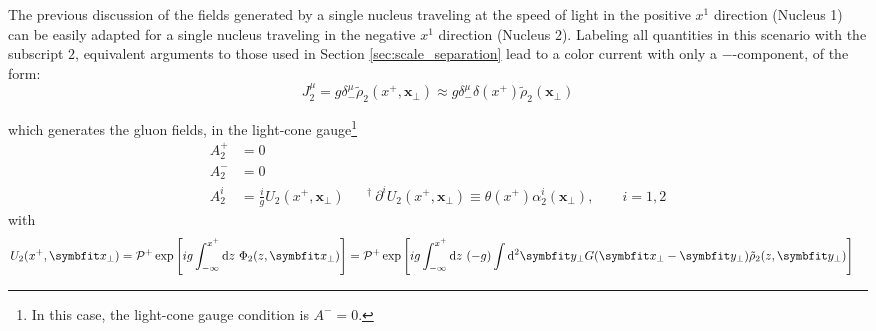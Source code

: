 %
%
\bigskip
The previous discussion of the fields generated by a single nucleus traveling at the speed of light in the positive $x^1$ direction (Nucleus 1) can be easily adapted for a single nucleus traveling in the negative $x^1$ direction (Nucleus 2). Labeling all quantities in this scenario with the subscript $2$, equivalent arguments to those used in Section \ref{sec:scale_separation} lead to a color current with only a $-$-component, of the form:
\begin{equation}
	J_2^\mu = g \delta^{\mu}_- \tilde{\rho}_2(x^+,\mathbf{x}_\perp) \approx g \delta^{\mu}_- \delta (x^+) \tilde{\rho}_2(\mathbf{x}_\perp)
\end{equation}

which generates the gluon fields, in the light-cone gauge\footnote{In this case, the light-cone gauge condition is $A^- = 0$.}
\begin{subequations}
	\begin{alignat}{2}
		A^+_2 & = 0 && \\
		A^-_2 & = 0 && \\
		A^i_2 & = \frac{i}{g} U_2(x^+,\mathbf{x}_\perp)&& ^\dagger ~  \partial^i U_2(x^+,\mathbf{x}_\perp) \equiv \theta(x^+) \alpha_2^i(\mathbf{x}_\perp), \qquad i = 1,2
	\end{alignat}
	\label{eq:A_lc_one_nucleus_2}
\end{subequations}
with
\begin{align}
	U_2(x^+, \mathbf{x}_\perp) & =
	\mathcal{P}^+ \exp  \Bigg[ig \int_{-\infty}^{x^+} \diff z ~ \Phi_2 (z, \mathbf{x}_\perp) \Bigg] \nonumber
	=  \mathcal{P}^+ \exp  \Bigg[ig \int_{-\infty}^{x^+} \diff z ~ (- g) \int \diff^2 \mathbf{y}_\perp G(\mathbf{x_\perp} - \mathbf{y_\perp}) \tilde{\rho}_2(z,\mathbf{y}_\perp) \Bigg] \nonumber
\end{align}

